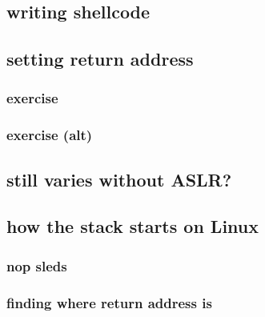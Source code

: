 \subsection{writing shellcode}




\subsection{setting return address}


\subsubsection{exercise}


\subsubsection{exercise (alt)}



\subsection{still varies without ASLR?}


\subsection{how the stack starts on Linux}


\subsubsection{nop sleds}




\subsubsection{finding where return address is}


